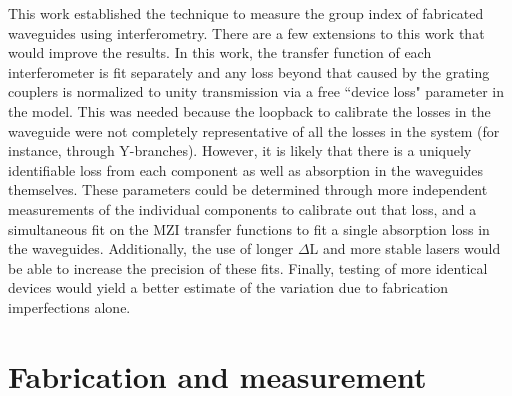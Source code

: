 \documentclass[journal]{IEEEtran}
\begin{document}
This work established the technique to measure the group index of fabricated waveguides using interferometry. There are a few extensions to this work that would improve the results. In this work, the transfer function of each interferometer is fit separately and any loss beyond that caused by the grating couplers is normalized to unity transmission via a free ``device loss" parameter in the model. This was needed because the loopback to calibrate the losses in the waveguide were not completely representative of all the losses in the system (for instance, through Y-branches). However, it is likely that there is a uniquely identifiable loss from each component as well as absorption in the waveguides themselves. These parameters could be determined through more independent measurements of the individual components to calibrate out that loss, and a simultaneous fit on the MZI transfer functions to fit a single absorption loss in the waveguides. Additionally, the use of longer $\Delta$L and more stable lasers would be able to increase the precision of these fits. Finally, testing of more identical devices would yield a better estimate of the variation due to fabrication imperfections alone.

\section{Fabrication and measurement}
% 
\end{document}
